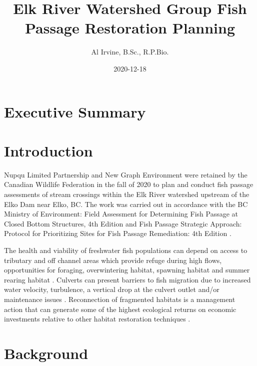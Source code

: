 \documentclass[
]{book}
\title{Elk River Watershed Group Fish Passage Restoration Planning}
\author{Al Irvine, B.Sc., R.P.Bio.}
\date{2020-12-18}
\begin{document}
\maketitle

{
\setcounter{tocdepth}{1}
\tableofcontents
}
\hypertarget{executive-summary}{%
\chapter*{Executive Summary}\label{executive-summary}}

\hypertarget{intro}{%
\chapter{Introduction}\label{intro}}

Nupqu Limited Partnership and New Graph Environment were retained by the Canadian Wildlife Federation in the fall of 2020 to plan and conduct fish passage assessments of stream crossings within the Elk River watershed upstream of the Elko Dam near Elko, BC. The work was carried out in accordance with the BC Ministry of Environment: Field Assessment for Determining Fish Passage at Closed Bottom Structures, 4th Edition \citep{fish_passage_assessments} and Fish Passage Strategic Approach: Protocol for Prioritizing Sites for Fish Passage Remediation: 4th Edition \citep{fishpassagetechnicalworkinggroupFishPassageStrategic2014}.

The health and viability of freshwater fish populations can depend on access to tributary and off channel areas which provide refuge during high flows, opportunities for foraging, overwintering habitat, spawning habitat and summer rearing habitat \citep{Bramblett_2002, swalesRoleOffChannelPonds1989}. Culverts can present barriers to fish migration due to increased water velocity, turbulence, a vertical drop at the culvert outlet and/or maintenance issues \citep{slaneyFishHabitatRehabilitation1997}. Reconnection of fragmented habitats is a management action that can generate some of the highest ecological returns on economic investments relative to other habitat restoration techniques \citep{saldicaromileStreamHabitatRestoration2004}.

\hypertarget{background}{%
\chapter{Background}\label{background}}
\end{document}
